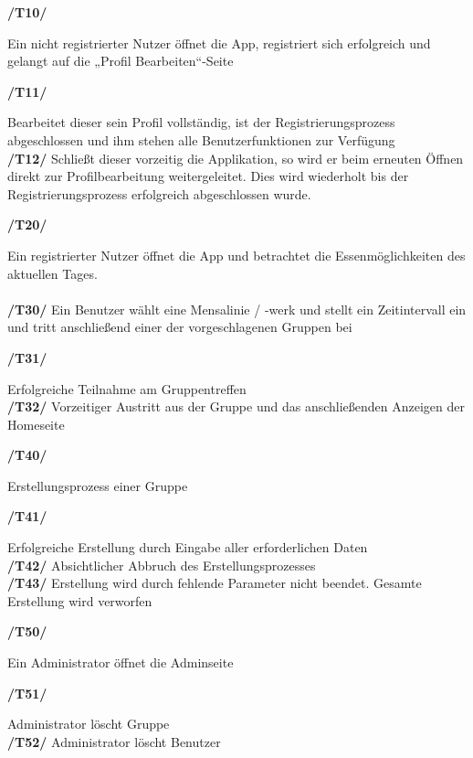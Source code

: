 \documentclass[a4paper]{scrreprt}
\begin{document}
\begin{addmargin}[25pt]{0pt} 
\hypertarget{t10}{\textbf{/T10/}} Ein nicht registrierter Nutzer öffnet die App, registriert sich erfolgreich und gelangt auf die „Profil Bearbeiten“-Seite\\
  \begin{addmargin}[25pt]{0pt} 
  \hypertarget{t11}{\textbf{/T11/}} Bearbeitet dieser sein Profil vollständig, ist der Registrierungsprozess abgeschlossen und ihm stehen alle Benutzerfunktionen zur Verfügung\\
  \hypertarget{t12}{\textbf{/T12/}} Schließt dieser vorzeitig die Applikation, so wird er beim erneuten Öffnen direkt zur Profilbearbeitung weitergeleitet. Dies wird wiederholt bis der Registrierungsprozess erfolgreich abgeschlossen wurde.\\
  \end{addmargin}
\hypertarget{t20}{\textbf{/T20/}} Ein registrierter Nutzer öffnet die App und betrachtet die Essenmöglichkeiten des aktuellen Tages.\\ \\
\hypertarget{t30}{\textbf{/T30/}} Ein Benutzer wählt eine Mensalinie / -werk und stellt ein Zeitintervall ein und tritt anschließend einer der vorgeschlagenen Gruppen bei\\
  \begin{addmargin}[25pt]{0pt} 
  \hypertarget{t31}{\textbf{/T31/}} Erfolgreiche Teilnahme am Gruppentreffen\\
  \hypertarget{t32}{\textbf{/T32/}} Vorzeitiger Austritt aus der Gruppe und das anschließenden Anzeigen der Homeseite\\
  \end{addmargin}
\hypertarget{t40}{\textbf{/T40/}}  Erstellungsprozess einer Gruppe\\
  \begin{addmargin}[25pt]{0pt} 
  \hypertarget{t41}{\textbf{/T41/}} Erfolgreiche Erstellung durch Eingabe aller erforderlichen Daten\\
  \hypertarget{t42}{\textbf{/T42/}} Absichtlicher Abbruch des Erstellungsprozesses\\
  \hypertarget{t43}{\textbf{/T43/}} Erstellung wird durch fehlende Parameter nicht beendet. Gesamte Erstellung wird verworfen\\
  \end{addmargin}
\hypertarget{t50}{\textbf{/T50/}} Ein Administrator öffnet die Adminseite\\
  \begin{addmargin}[25pt]{0pt} 
  \hypertarget{t10}{\textbf{/T51/}} Administrator löscht Gruppe\\
  \hypertarget{t10}{\textbf{/T52/}} Administrator löscht Benutzer\\
  \end{addmargin}



\end{addmargin}
\end{document}
